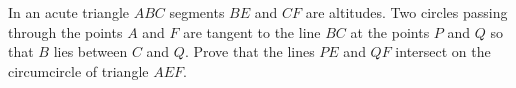 In an acute triangle $ABC$ segments $BE$ and $CF$ are altitudes. Two circles passing through the points $A$ and $F$ are tangent to the line $BC$ at the points $P$ and $Q$ so that $B$ lies between $C$ and $Q$. Prove that the lines $PE$ and $QF$ intersect on the circumcircle of triangle $AEF$.
